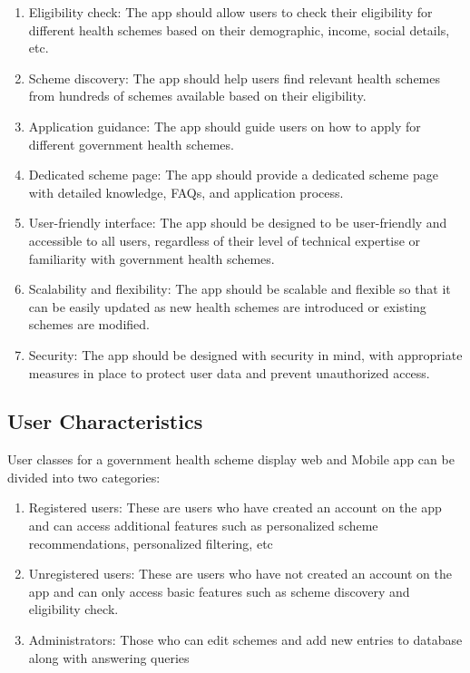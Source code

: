 \documentclass{article}
\begin{document}
\begin{enumerate}
\item
  Eligibility check: The app should allow users to check their
  eligibility for different health schemes based on their demographic,
  income, social details, etc.
\item
  Scheme discovery: The app should help users find relevant health
  schemes from hundreds of schemes available based on their
  eligibility.
\item
  Application guidance: The app should guide users on how to apply for
  different government health schemes.
\item
  Dedicated scheme page: The app should provide a dedicated scheme page
  with detailed knowledge, FAQs, and application process.
\item
  User-friendly interface: The app should be designed to be
  user-friendly and accessible to all users, regardless of their level
  of technical expertise or familiarity with government health
  schemes.
\item
  Scalability and flexibility: The app should be scalable and flexible
  so that it can be easily updated as new health schemes are introduced
  or existing schemes are modified.
\item
  Security: The app should be designed with security in mind, with
  appropriate measures in place to protect user data and prevent
  unauthorized access.
\end{enumerate}

\subsection{User Characteristics}
User classes for a government health scheme display web and Mobile app
can be divided into two categories:

\begin{enumerate}
\item
  Registered users: These are users who have created an account on the
  app and can access additional features such as personalized scheme
  recommendations, personalized filtering, etc
\item
  Unregistered users: These are users who have not created an account on
  the app and can only access basic features such as scheme discovery
  and eligibility check.
\item
  Administrators: Those who can edit schemes and add new entries to
  database along with answering queries
\end{enumerate}
\end{document}
